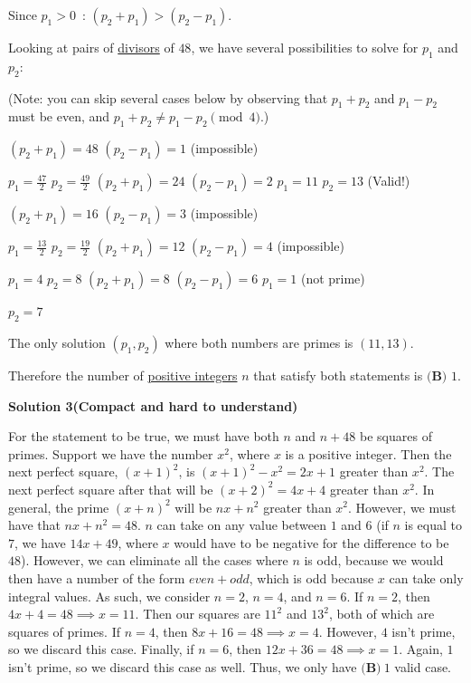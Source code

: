 \begin{enumerate}
 Since $p_{1} > 0$ : $(p_{2}+p_{1}) > (p_{2}-p_{1})$. 

 Looking at pairs of \href{https://artofproblemsolving.com/wiki/index.php?title=Divisor}{divisors} of $48$, we have several possibilities to solve for $p_{1}$ and $p_{2}$:

 (Note: you can skip several cases below by observing that $p_1+p_2$ and $p_1-p_{2}$ must be even, and $p_1+p_2  \neq  p_1-p_2 \pmod 4$.)

 $(p_{2}+p_{1}) = 48$
$(p_{2}-p_{1}) = 1$ (impossible)

 $p_{1} = \frac{47}{2}$
$p_{2} = \frac{49}{2}$
$(p_{2}+p_{1}) = 24$
$(p_{2}-p_{1}) = 2$
$p_{1} = 11$
$p_{2} = 13$ (Valid!)

 
$(p_{2}+p_{1}) = 16$
$(p_{2}-p_{1}) = 3$  (impossible)

 $p_{1} = \frac{13}{2}$
$p_{2} = \frac{19}{2}$
$(p_{2}+p_{1}) = 12$
$(p_{2}-p_{1}) = 4$  (impossible)

 $p_{1} = 4$
$p_{2} = 8$
$(p_{2}+p_{1}) = 8$
$(p_{2}-p_{1}) = 6$
$p_{1} = 1$  (not prime)

 $p_{2} = 7$

 
The only solution $(p_{1} , p_{2})$ where both numbers are primes is $(11,13)$. 

 Therefore the number of \href{https://artofproblemsolving.com/wiki/index.php?title=Positive\_integer}{positive integers} $n$ that satisfy both statements is $\boxed{\textbf{(B) }1}.$




\textbf{Solution 3(Compact and hard to understand)}

For the statement to be true, we must have both $n$ and $n + 48$ be squares of primes. Support we have the number $x^2$, where $x$ is a positive integer. Then the next perfect square, $(x+1)^2$, is $(x+1)^2 - x^2 = 2x+1$ greater than $x^2$. The next perfect square after that will be $(x+2)^2 = 4x + 4$ greater than $x^2$. In general, the prime $(x+n)^2$ will be $nx + n^2$ greater than $x^2$. However, we must have that $nx + n^2 = 48$. $n$ can take on any value between $1$ and $6$ (if $n$ is equal to $7$, we have $14x + 49$, where $x$ would have to be negative for the difference to be $48$). However, we can eliminate all the cases where $n$ is odd, because we would then have a number of the form $even + odd$, which is odd because $x$ can take only integral values. As such, we consider $n = 2$, $n = 4$, and $n = 6$. If $n = 2$, then $4x + 4 = 48 \implies x = 11$. Then our squares are $11^2$ and $13^2$, both of which are squares of primes. If $n = 4$, then $8x + 16 = 48 \implies x = 4$. However, $4$ isn't prime, so we discard this case. Finally, if $n = 6$, then $12x + 36 = 48 \implies x = 1$. Again, $1$ isn't prime, so we discard this case as well. Thus, we only have $\boxed{\textbf{(B)}~1}$ valid case.


\end{enumerate}
